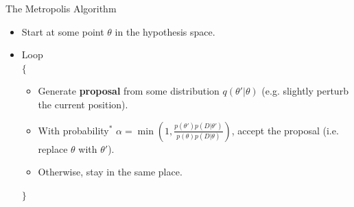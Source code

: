 \begin{frame}[t]{The Metropolis Algorithm}

\begin{itemize}
\item Start at some point $\theta$ in the hypothesis space.
\item Loop\\
$\{$
  \begin{itemize}
  \item Generate {\bf proposal} from some distribution $q(\theta' | \theta)$
  (e.g. slightly perturb the current position).
  \item With probability$^*$ $\alpha = \min\left(1, \frac{p(\theta')p(D|\theta')}{p(\theta)p(D|\theta)}\right)$, accept the proposal (i.e. replace $\theta$ with $\theta'$).
  \item Otherwise, stay in the same place.
  \end{itemize}
$\}$
\end{itemize}
\end{frame}


